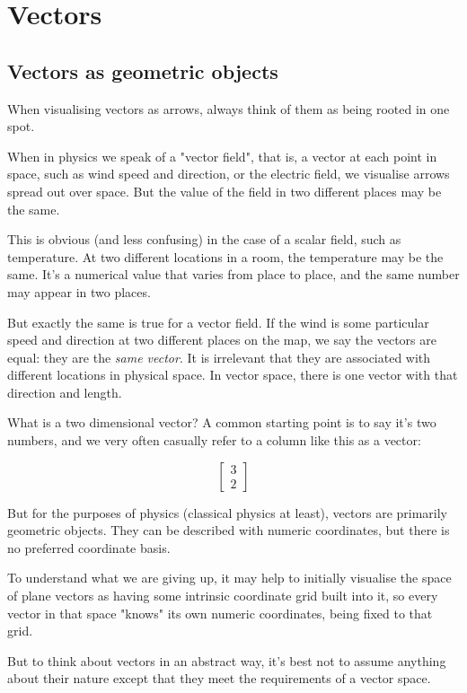 \chapter {Vectors} \label{ch:vectors}

\section{Vectors as geometric objects}

When visualising vectors as arrows, always think of them as being rooted in one spot.

When in physics we speak of a "vector field", that is, a vector at each point in space, such as wind speed and direction, or the electric field, we visualise arrows spread out over space. But the value of the field in two different places may be the same.

This is obvious (and less confusing) in the case of a scalar field, such as temperature. At two different locations in a room, the temperature may be the same. It's a numerical value that varies from place to place, and the same number may appear in two places.

But exactly the same is true for a vector field. If the wind is some particular speed and direction at two different places on the map, we say the vectors are equal: they are the \textit{same vector}. It is irrelevant that they are associated with different locations in physical space. In vector space, there is one vector with that direction and length.

What is a two dimensional vector? A common starting point is to say it's two numbers, and we very often casually refer to a column like this as a vector:

$$
\begin{bmatrix}3 \\ 2\end{bmatrix}
$$

But for the purposes of physics (classical physics at least), vectors are primarily geometric objects. They can be described with numeric coordinates, but there is no preferred coordinate basis.

To understand what we are giving up, it may help to initially visualise the space of plane vectors as having some intrinsic coordinate grid built into it, so every vector in that space "knows" its own numeric coordinates, being fixed to that grid.

But to think about vectors in an abstract way, it's best not to assume anything about their nature except that they meet the requirements of a vector space.


